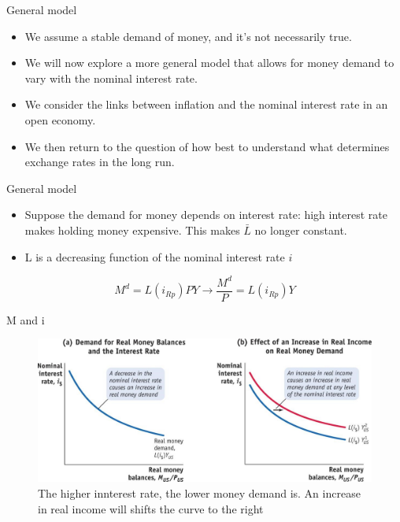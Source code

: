 \documentclass[
  ignorenonframetext,
]{beamer}
\begin{document}
\begin{frame}{General model}
\label{general-model}
\begin{itemize}
\item
  We assume a stable demand of money, and it's not necessarily true.
\item
  We will now explore a more general model that allows for money demand
  to vary with the nominal interest rate.
\item
  We consider the links between inflation and the nominal interest rate
  in an open economy.
\item
  We then return to the question of how best to understand what
  determines exchange rates in the long run.
\end{itemize}
\end{frame}

\begin{frame}{General model}
\label{general-model-1}
\begin{itemize}
\item
  Suppose the demand for money depends on interest rate: high interest
  rate makes holding money expensive. This makes \(\bar{L}\) no longer
  constant.
\item
  L is a decreasing function of the nominal interest rate \(i\)
\end{itemize}

\begin{equation}
M^d=L(i_{Rp})PY \rightarrow \frac{M^d}{P}=L(i_{Rp})Y
\end{equation}
\end{frame}

\begin{frame}{M and i}
\label{m-and-i}
\begin{figure}[H]

{\centering \includegraphics{Picture5.jpg}

}

\caption{The higher innterest rate, the lower money demand is. An
increase in real income will shifts the curve to the right}

\end{figure}%
\end{frame}
\end{document}
